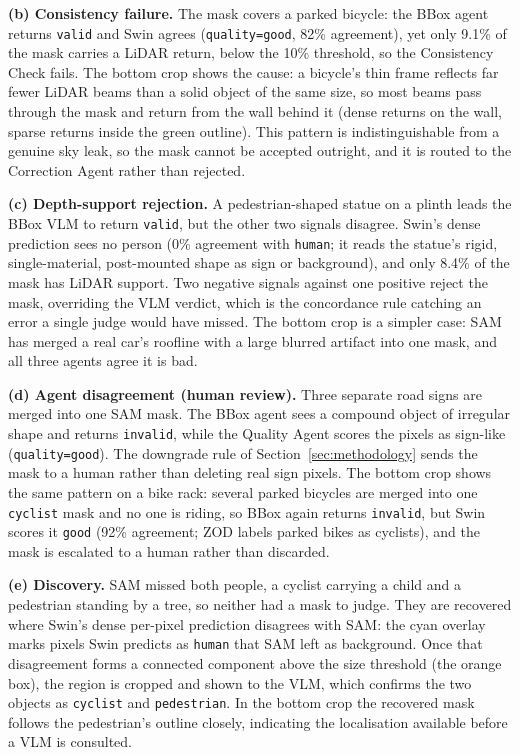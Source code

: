 \documentclass[conference]{IEEEtran}
\begin{document}
\textbf{(b) Consistency failure.} The mask covers a parked bicycle: the BBox agent returns \texttt{valid} and Swin agrees (\texttt{quality=good}, 82\% agreement), yet only 9.1\% of the mask carries a LiDAR return, below the 10\% threshold, so the Consistency Check fails. The bottom crop shows the cause: a bicycle's thin frame reflects far fewer LiDAR beams than a solid object of the same size, so most beams pass through the mask and return from the wall behind it (dense returns on the wall, sparse returns inside the green outline). This pattern is indistinguishable from a genuine sky leak, so the mask cannot be accepted outright, and it is routed to the Correction Agent rather than rejected.

\textbf{(c) Depth-support rejection.} A pedestrian-shaped statue on a plinth leads the BBox VLM to return \texttt{valid}, but the other two signals disagree. Swin's dense prediction sees no person (0\% agreement with \texttt{human}; it reads the statue's rigid, single-material, post-mounted shape as sign or background), and only 8.4\% of the mask has LiDAR support. Two negative signals against one positive reject the mask, overriding the VLM verdict, which is the concordance rule catching an error a single judge would have missed. The bottom crop is a simpler case: SAM has merged a real car's roofline with a large blurred artifact into one mask, and all three agents agree it is bad.

\textbf{(d) Agent disagreement (human review).} Three separate road signs are merged into one SAM mask. The BBox agent sees a compound object of irregular shape and returns \texttt{invalid}, while the Quality Agent scores the pixels as sign-like (\texttt{quality=good}). The downgrade rule of Section~\ref{sec:methodology} sends the mask to a human rather than deleting real sign pixels. The bottom crop shows the same pattern on a bike rack: several parked bicycles are merged into one \texttt{cyclist} mask and no one is riding, so BBox again returns \texttt{invalid}, but Swin scores it \texttt{good} (92\% agreement; ZOD labels parked bikes as cyclists), and the mask is escalated to a human rather than discarded.

\textbf{(e) Discovery.} SAM missed both people, a cyclist carrying a child and a pedestrian standing by a tree, so neither had a mask to judge. They are recovered where Swin's dense per-pixel prediction disagrees with SAM: the cyan overlay marks pixels Swin predicts as \texttt{human} that SAM left as background. Once that disagreement forms a connected component above the size threshold (the orange box), the region is cropped and shown to the VLM, which confirms the two objects as \texttt{cyclist} and \texttt{pedestrian}. In the bottom crop the recovered mask follows the pedestrian's outline closely, indicating the localisation available before a VLM is consulted.
\end{document}
